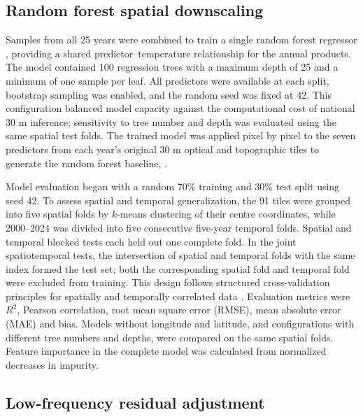 \subsection{Random forest spatial downscaling}

Samples from all 25 years were combined to train a single random forest regressor \parencite{breiman2001random}, providing a shared predictor--temperature relationship for the annual products. The model contained 100 regression trees with a maximum depth of 25 and a minimum of one sample per leaf. All predictors were available at each split, bootstrap sampling was enabled, and the random seed was fixed at 42. This configuration balanced model capacity against the computational cost of national 30 m inference; sensitivity to tree number and depth was evaluated using the same spatial test folds. The trained model was applied pixel by pixel to the seven predictors from each year's original 30 m optical and topographic tiles to generate the random forest baseline, \rf{}.

Model evaluation began with a random 70\% training and 30\% test split using seed 42. To assess spatial and temporal generalization, the 91 tiles were grouped into five spatial folds by $k$-means clustering of their centre coordinates, while 2000--2024 was divided into five consecutive five-year temporal folds. Spatial and temporal blocked tests each held out one complete fold. In the joint spatiotemporal tests, the intersection of spatial and temporal folds with the same index formed the test set; both the corresponding spatial fold and temporal fold were excluded from training. This design follows structured cross-validation principles for spatially and temporally correlated data \parencite{roberts2017cv,valavi2019blockcv,meyer2018spatiotemporal}. Evaluation metrics were $R^2$, Pearson correlation, root mean square error (RMSE), mean absolute error (MAE) and bias. Models without longitude and latitude, and configurations with different tree numbers and depths, were compared on the same spatial folds. Feature importance in the complete model was calculated from normalized decreases in impurity.

\subsection{Low-frequency residual adjustment}


